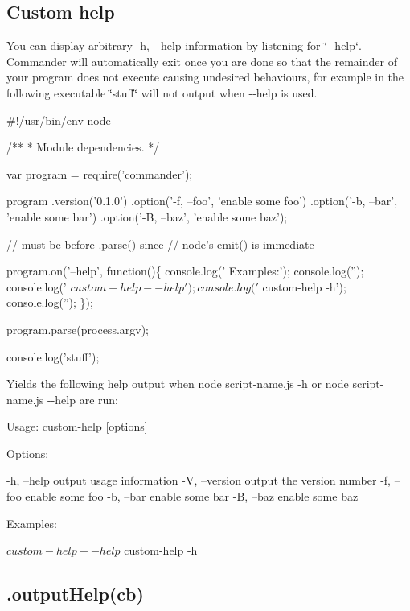 \subsection*{Custom help}

You can display arbitrary {\ttfamily -\/h, -\/-\/help} information by listening for \char`\"{}-\/-\/help\char`\"{}. Commander will automatically exit once you are done so that the remainder of your program does not execute causing undesired behaviours, for example in the following executable \char`\"{}stuff\char`\"{} will not output when {\ttfamily -\/-\/help} is used.


\begin{DoxyCode}
#!/usr/bin/env node

/**
 * Module dependencies.
 */

var program = require('commander');

program
  .version('0.1.0')
  .option('-f, --foo', 'enable some foo')
  .option('-b, --bar', 'enable some bar')
  .option('-B, --baz', 'enable some baz');

// must be before .parse() since
// node's emit() is immediate

program.on('--help', function()\{
  console.log('  Examples:');
  console.log('');
  console.log('    $ custom-help --help');
  console.log('    $ custom-help -h');
  console.log('');
\});

program.parse(process.argv);

console.log('stuff');
\end{DoxyCode}


Yields the following help output when {\ttfamily node script-\/name.\+js -\/h} or {\ttfamily node script-\/name.\+js -\/-\/help} are run\+:


\begin{DoxyCode}
Usage: custom-help [options]

Options:

  -h, --help     output usage information
  -V, --version  output the version number
  -f, --foo      enable some foo
  -b, --bar      enable some bar
  -B, --baz      enable some baz

Examples:

  $ custom-help --help
  $ custom-help -h
\end{DoxyCode}


\subsection*{.output\+Help(cb)}

